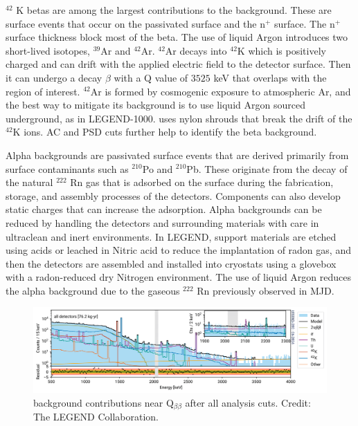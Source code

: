 $^{42}$ K betas are among the largest contributions to the background. These are surface events that occur on the passivated surface and the n$^+$ surface. The n$^+$ surface thickness block most of the beta. The use of liquid Argon introduces two short-lived isotopes, $^{39}$Ar and $^{42}$Ar.  $^{42}$Ar decays into $^{42}$K which is positively charged and can drift with the applied electric field to the detector surface. Then it can undergo a decay $\beta$ with a Q value of $3525$ keV that overlaps with the region of interest. $^{42}$Ar is formed by cosmogenic exposure to atmospheric Ar, and the best way to mitigate its background is to use liquid Argon sourced underground, as in LEGEND-1000. {\Ltwo} uses nylon shrouds that break the drift of the $^{42}$K ions. AC and PSD cuts further help to identify the beta background.

Alpha backgrounds are passivated surface events that are derived primarily from surface contaminants such as $^{210}$Po and $^{210}$Pb. These originate from the decay of the natural $^{222}$ Rn gas that is adsorbed on the surface during the fabrication, storage, and assembly processes of the detectors. Components can also develop static charges that can increase the adsorption. Alpha backgrounds can be reduced by handling the detectors and surrounding materials with care in ultraclean and inert environments. In LEGEND, support materials are etched using acids or leached in Nitric acid to reduce the implantation of radon gas, and then the detectors are assembled and installed into cryostats using a glovebox with a radon-reduced dry Nitrogen environment. The use of liquid Argon reduces the alpha background due to the gaseous $^{222}$ Rn previously observed in MJD. 

\begin{figure}
\centering
  \includegraphics[width=0.99\linewidth]{ch2/figs/l200_bkgmodel.png}
  \caption{{\Ltwo} background contributions near Q$_{\beta\beta}$ after all analysis cuts. Credit: The LEGEND Collaboration.}
\label{ch2:fig:L200_background_model_fit}
  \end{figure}


